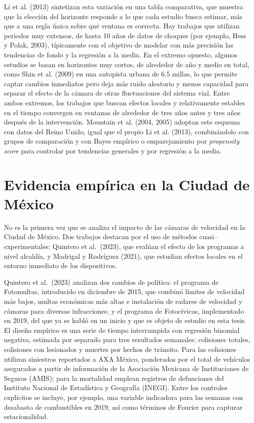 \indent  Li et al. (2013) sintetizan esta variación en una tabla comparativa, que muestra que la elección del horizonte responde a lo que cada estudio busca estimar, más que a una regla única sobre qué ventana es correcta. Hay trabajos que utilizan periodos muy extensos, de hasta 10 años de datos de choques (por ejemplo, Hess y Polak, 2003), típicamente con el objetivo de modelar con más precisión las tendencias de fondo y la regresión a la media. En el extremo opuesto, algunos estudios se basan en horizontes muy cortos, de alrededor de año y medio en total, como Shin et al. (2009) en una autopista urbana de 6.5 millas, lo que permite captar cambios inmediatos pero deja más ruido aleatorio y menos capacidad para separar el efecto de la cámara de otras fluctuaciones del sistema vial. Entre ambos extremos, los trabajos que buscan efectos locales y relativamente estables en el tiempo convergen en ventanas de alrededor de tres años antes y tres años después de la intervención. Mountain et al. (2004, 2005) adoptan este esquema con datos del Reino Unido, igual que el propio Li et al. (2013), combinándolo con grupos de comparación y con Bayes empírico o emparejamiento por \emph{propensity score} para controlar por tendencias generales y por regresión a la media. 

\section{Evidencia empírica en la Ciudad de México}

\noindent No es la primera vez que se analiza el impacto de las cámaras de velocidad en la Ciudad de México. Dos trabajos destacan por el uso de métodos cuasi–experimentales: Quintero et al.\ (2023), que evalúan el efecto de los programas a nivel alcaldía, y Madrigal y Rodríguez (2021), que estudian efectos locales en el entorno inmediato de los dispositivos.

Quintero et al.\ (2023) analizan dos cambios de política: el programa de Fotomultas, introducido en diciembre de 2015, que combinó límites de velocidad más bajos, multas económicas más altas e instalación de radares de velocidad y cámaras para diversas infracciones; y el programa de Fotocívicas, implementado en 2019, del que ya se habló en un inicio y que es objeto de estudio en esta tesis. El diseño empírico es una serie de tiempo interrumpida con regresión binomial negativa, estimada por separado para tres resultados semanales: colisiones totales, colisiones con lesionados y muertes por hechos de tránsito. Para las colisiones utilizan siniestros reportados a AXA México, ponderados por el total de vehículos asegurados a partir de información de la Asociación Mexicana de Instituciones de Seguros (AMIS); para la mortalidad emplean registros de defunciones del Instituto Nacional de Estadística y Geografía (INEGI). Entre los controles explícitos se incluye, por ejemplo, una variable indicadora para las semanas con desabasto de combustibles en 2019, así como términos de Fourier para capturar estacionalidad.\\

